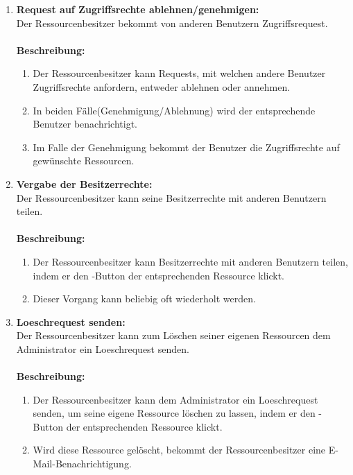 \documentclass[parskip=full,11pt]{scrartcl}
\def\threedigits#1{%
  \ifnum#1<10 0\fi
  \ifnum#1<1 0\fi
  \number#1}
\begin{document}
\begin{enumerate}[label={\textbf{/F\protect\threedigits{\theenumi}0/}}, leftmargin=*, resume]
\item \label{FARB4} \textbf {Request auf Zugriffsrechte ablehnen/genehmigen:}\\ 
Der Ressourcenbesitzer bekommt von anderen Benutzern Zugriffsrequest. \\\\
\textbf{Beschreibung:}\\
\begin{enumerate}[label=(\arabic*), leftmargin=*]
\item Der Ressourcenbesitzer kann Requests, mit welchen andere Benutzer Zugriffsrechte anfordern, entweder ablehnen oder annehmen.
\item In beiden Fälle(Genehmigung/Ablehnung) wird der entsprechende Benutzer benachrichtigt.
\item Im Falle der Genehmigung bekommt der Benutzer die Zugriffsrechte auf  gewünschte Ressourcen.
\end{enumerate}

\item \label{FARB5} \textbf{Vergabe der Besitzerrechte:}\\
Der Ressourcenbesitzer kann seine Besitzerrechte mit anderen Benutzern teilen.\\\\
\textbf{Beschreibung:}\\
\begin{enumerate}[label=(\arabic*), leftmargin=*]
\item Der Ressourcenbesitzer kann Besitzerrechte mit anderen Benutzern teilen, indem er den \grqq -Button der entsprechenden Ressource klickt.
\item Dieser Vorgang kann beliebig oft wiederholt werden.
\end{enumerate}

\item \label{FARB6} \textbf{Loeschrequest senden:}\\
Der Ressourcenbesitzer kann zum Löschen seiner eigenen Ressourcen dem Administrator ein Loeschrequest senden.\\\\
\textbf{Beschreibung:}\\
\begin{enumerate}[label=(\arabic*), leftmargin=*]
\item Der Ressourcenbesitzer kann dem Administrator ein Loeschrequest senden, um seine eigene Ressource löschen zu lassen, indem er den \grqq -Button der entsprechenden Ressource klickt.
\item Wird diese Ressource gelöscht, bekommt der Ressourcenbesitzer eine E-Mail-Benachrichtigung.
\end{enumerate}


\end{enumerate}
\end{document}
